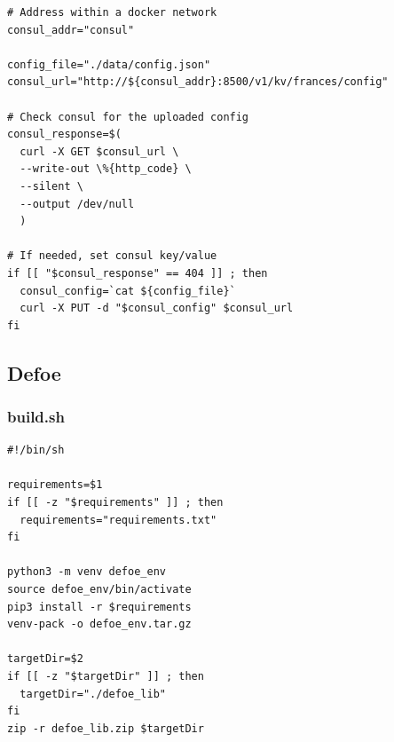 \documentclass[12pt, letterpaper]{article}
\begin{document}
\begin{verbatim}
# Address within a docker network
consul_addr="consul"

config_file="./data/config.json"
consul_url="http://${consul_addr}:8500/v1/kv/frances/config"

# Check consul for the uploaded config
consul_response=$(
  curl -X GET $consul_url \
  --write-out \%{http_code} \
  --silent \
  --output /dev/null
  )

# If needed, set consul key/value
if [[ "$consul_response" == 404 ]] ; then
  consul_config=`cat ${config_file}`
  curl -X PUT -d "$consul_config" $consul_url
fi
\end{verbatim}

\subsection{Defoe}
\subsubsection{build.sh}\label{appendix:defoe-build.sh}

\begin{verbatim}
#!/bin/sh

requirements=$1
if [[ -z "$requirements" ]] ; then
  requirements="requirements.txt"
fi

python3 -m venv defoe_env
source defoe_env/bin/activate
pip3 install -r $requirements
venv-pack -o defoe_env.tar.gz

targetDir=$2
if [[ -z "$targetDir" ]] ; then
  targetDir="./defoe_lib"
fi
zip -r defoe_lib.zip $targetDir
\end{verbatim}
\end{document}
